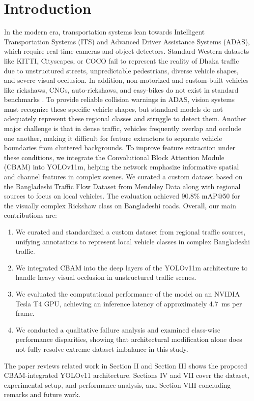 \documentclass[conference]{IEEEtran}
\begin{document}
\section{Introduction}
In the modern era, transportation systems lean towards Intelligent Transportation Systems (ITS) and Advanced Driver Assistance Systems (ADAS), which require real-time cameras and object detectors. Standard Western datasets like KITTI\cite{1a}, Cityscapes\cite{2a}, or COCO\cite{3a} fail to represent the reality of Dhaka traffic due to unstructured streets, unpredictable pedestrians, diverse vehicle shapes, and severe visual occlusion. In addition, non-motorized and custom-built vehicles like rickshaws, CNGs, auto-rickshaws, and easy-bikes do not exist in standard benchmarks \cite{Hasan2021VehicleClassification}. To provide reliable collision warnings in ADAS, vision systems must recognize these specific vehicle shapes, but standard models do not adequately represent these regional classes and struggle to detect them. Another major challenge is that in dense traffic, vehicles frequently overlap and occlude one another, making it difficult for feature extractors to separate vehicle boundaries from cluttered backgrounds. To improve feature extraction under these conditions, we integrate the Convolutional Block Attention Module (CBAM)\cite{Woo2018CBAM} into YOLOv11m, helping the network emphasize informative spatial and channel features in complex scenes. We curated a custom dataset based on the Bangladeshi Traffic Flow Dataset from Mendeley Data\cite{Islam2025BangladeshiTrafficFlow} along with regional sources to focus on local vehicles. The evaluation achieved 90.8\% mAP@50 for the visually complex Rickshaw class on Bangladeshi roads.
Overall, our main contributions are:
\begin{enumerate}
    \item We curated and standardized a custom dataset from regional traffic sources, unifying annotations to represent local vehicle classes in complex Bangladeshi traffic.
    \item We integrated CBAM into the deep layers of the YOLOv11m architecture to handle heavy visual occlusion in unstructured traffic scenes.
    \item We evaluated the computational performance of the model on an NVIDIA Tesla T4 GPU, achieving an inference latency of approximately 4.7~ms per frame.
    \item We conducted a qualitative failure analysis and examined class-wise performance disparities, showing that architectural modification alone does not fully resolve extreme dataset imbalance in this study.
\end{enumerate}
The paper reviews related work in Section II and Section III shows the proposed CBAM-integrated YOLOv11 architecture. Sections IV and VII cover the dataset, experimental setup, and performance analysis, and  Section VIII concluding remarks and future work.
\end{document}
